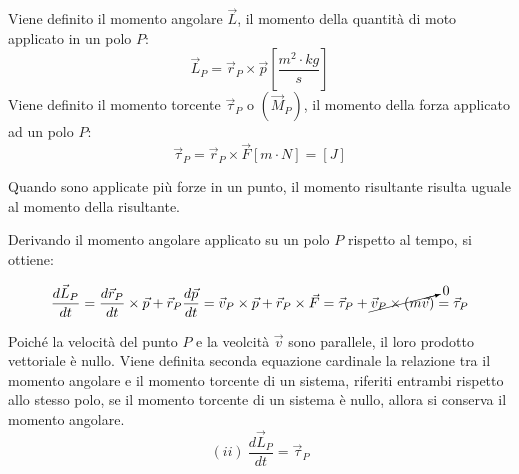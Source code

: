 \documentclass{article}
\numberwithin{equation}{subsection}
\begin{document}
\begin{center}\end{center}

Viene definito il momento angolare $\vec{L}$, il momento della 
quantità di moto applicato in un polo $P$:
\begin{equation} 
    \vec{L}_P=\vec{r}_P\times\vec{p}\left[\displaystyle\frac{m^2\cdot kg}{s}\right]
\end{equation}
Viene definito il momento torcente $\vec{\tau}_P$ o $(\vec{M}_P)$, il momento della forza applicato 
ad un polo $P$:
\begin{equation}
    \vec{\tau}_P=\vec{r}_P\times\vec{F}\left[m\cdot N\right]=[J]
\end{equation}

Quando sono applicate più forze in un punto, il momento risultante risulta uguale al momento della risultante. 

Derivando il momento angolare applicato su un polo $P$ rispetto al tempo, si ottiene: 


\begin{equation}
    \displaystyle\frac{d\vec{L}_P}{dt}=\frac{d\vec{r}_P}{dt}\times\vec{p}+\vec{r}_P\frac{d\vec{p}}{dt}=\vec{v}_P\times\vec{p}+\vec{r}_P\times\vec{F}=\vec{\tau}_P+\cancelto{0}{\vec{v}_P\times(m\vec{v})}=\vec{\tau}_P
\end{equation}


Poiché la velocità del punto $P$ e la veolcità 
$\vec{v}$ sono parallele, il loro prodotto vettoriale è nullo.
Viene 
definita seconda equazione cardinale la relazione tra il momento angolare e il momento torcente di un sistema, riferiti entrambi rispetto allo stesso polo, se il momento torcente di un sistema è nullo, allora si conserva 
il momento angolare.
\begin{equation*}
    (ii)\:\displaystyle\frac{d\vec{L}_P}{dt}=\vec{\tau}_P
\end{equation*}
\end{document}
